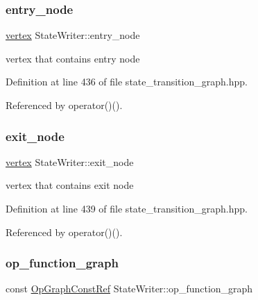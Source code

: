 \mbox{\label{classStateWriter_af4cb9892d0113b94691263547e690f4b}} 
\subsubsection{\texorpdfstring{entry\+\_\+node}{entry\_node}}
{\footnotesize\ttfamily \hyperlink{graph_8hpp_abefdcf0544e601805af44eca032cca14}{vertex} State\+Writer\+::entry\+\_\+node\hspace{0.3cm}{\ttfamily [private]}}



vertex that contains entry node 



Definition at line 436 of file state\+\_\+transition\+\_\+graph.\+hpp.



Referenced by operator()().

\mbox{\label{classStateWriter_a7444586062a025924265918fe48a165a}} 
\subsubsection{\texorpdfstring{exit\+\_\+node}{exit\_node}}
{\footnotesize\ttfamily \hyperlink{graph_8hpp_abefdcf0544e601805af44eca032cca14}{vertex} State\+Writer\+::exit\+\_\+node\hspace{0.3cm}{\ttfamily [private]}}



vertex that contains exit node 



Definition at line 439 of file state\+\_\+transition\+\_\+graph.\+hpp.



Referenced by operator()().

\mbox{\label{classStateWriter_abcb4ae917ec6ffa9b15fd81615a82071}} 
\subsubsection{\texorpdfstring{op\+\_\+function\+\_\+graph}{op\_function\_graph}}
{\footnotesize\ttfamily const \hyperlink{op__graph_8hpp_a9a0b240622c47584bee6951a6f5de746}{Op\+Graph\+Const\+Ref} State\+Writer\+::op\+\_\+function\+\_\+graph\hspace{0.3cm}{\ttfamily [private]}}



